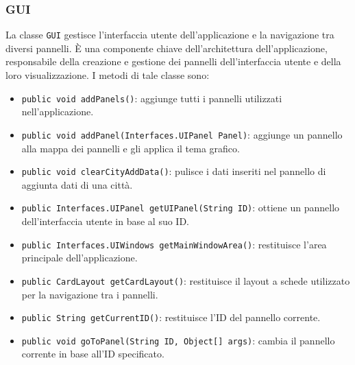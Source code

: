\subsubsection {GUI}
La classe \texttt{GUI} gestisce l'interfaccia utente dell'applicazione e la navigazione tra diversi pannelli. 
È una componente chiave dell'architettura dell'applicazione, responsabile della creazione e gestione dei pannelli dell'interfaccia utente e della loro visualizzazione.
I metodi di tale classe sono:
\begin{itemize}
    \item \texttt{public void addPanels()}: aggiunge tutti i pannelli utilizzati nell'applicazione.
    \item \texttt{public void addPanel(Interfaces.UIPanel Panel)}: aggiunge un pannello alla mappa dei pannelli e gli applica il tema grafico.
    \item \texttt{public void clearCityAddData()}: pulisce i dati inseriti nel pannello di aggiunta dati di una città.
    \item \texttt{public Interfaces.UIPanel getUIPanel(String ID)}: ottiene un pannello dell'interfaccia utente in base al suo ID.
    \item \texttt{public Interfaces.UIWindows getMainWindowArea()}: restituisce l'area principale dell'applicazione.
    \item \texttt{public CardLayout getCardLayout()}: restituisce il layout a schede utilizzato per la navigazione tra i pannelli.
    \item \texttt{public String getCurrentID()}: restituisce l'ID del pannello corrente.
    \item \texttt{public void goToPanel(String ID, Object[] args)}: cambia il pannello corrente in base all'ID specificato.
\end{itemize}


